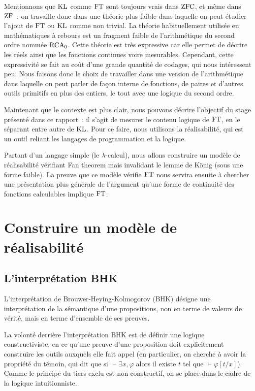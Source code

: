 \documentclass{article}
\begin{document}
Mentionnons que $\mathrm{KL}$ comme $\mathrm{FT}$ sont toujours vrais dans $\mathrm{ZFC}$, et même dans $\mathrm{ZF}$~: on travaille donc dans une théorie plus faible dans laquelle on peut étudier l'ajout de $\mathrm{FT}$ ou $\mathrm{KL}$ comme non trivial. La théorie habituellement utilisée en mathématiques à rebours est un fragment faible de l'arithmétique du second ordre nommée $\mathrm{RCA}_0$. Cette théorie est très expressive car elle permet de décrire les réels ainsi que les fonctions continues voire mesurables. Cependant, cette expressivité se fait au coût d'une grande quantité de codages, qui nous intéressent peu. Nous faisons donc le choix de travailler dans une version de l'arithmétique dans laquelle on peut parler de façon interne de fonctions, de paires et d'autres outils primitifs en plus des entiers, le tout avec une logique du second ordre.

Maintenant que le contexte est plus clair, nous pouvons décrire l'objectif du stage présenté dans ce rapport~: il s'agit de mesurer le contenu logique de $\mathrm{FT}$, en le séparant entre autre de $\mathrm{KL}$. Pour ce faire, nous utilisons la réalisabilité, qui est un outil reliant les langages de programmation et la logique.

Partant d'un langage simple (le $\lambda$-calcul), nous allons construire un modèle de réalisabilité vérifiant Fan theorem mais invalidant le lemme de König (sous une forme faible). La preuve que ce modèle vérifie $\mathrm{FT}$ nous servira ensuite à chercher une présentation plus générale de l'argument qu'une forme de continuité des fonctions calculables implique $\mathrm{FT}$.

\section{Construire un modèle de réalisabilité}

\subsection{L'interprétation BHK}

L'interprétation de Brouwer-Heying-Kolmogorov (BHK) désigne une interprétation de la sémantique d'une propositions, non en terme de valeurs de vérité, mais en terme d'ensemble de ses preuves.

La volonté derrière l'interprétation BHK est de définir une logique constructiviste, en ce qu'une preuve d'une proposition doit explicitement construire les outils auxquels elle fait appel (en particulier, on cherche à avoir la propriété du témoin, qui dit que si $\vdash \exists x, \varphi$ alors il existe $t$ tel que $\vdash \varphi[t/x]$). Comme le principe du tiers exclu est non constructif, on se place dans le cadre de la logique intuitionniste.
\end{document}

